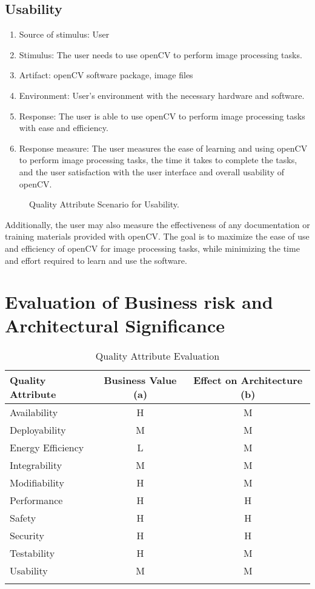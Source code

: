 \subsection{Usability\label{subSection::UsabilityQA}}
\begin{enumerate}
    \item Source of stimulus: User
    \item Stimulus: The user needs to use openCV to perform image processing tasks.
    \item Artifact: openCV software package, image files
    \item Environment: User's environment with the necessary hardware and software.
    \item Response: The user is able to use openCV to perform image processing tasks with ease and efficiency.
    \item Response measure: The user measures the ease of learning and using openCV to perform image processing tasks, the time it takes to complete the tasks, and the user satisfaction with the user interface and overall usability of openCV.
\end{enumerate}
\begin{figure}[H]
\caption{\label{Figure::Quality Attribute Scenario for Usability} Quality Attribute Scenario for Usability.}
\end{figure}
Additionally, the user may also measure the effectiveness of any documentation or training materials provided with openCV. The goal is to maximize the ease of use and efficiency of openCV for image processing tasks, while minimizing the time and effort required to learn and use the software.
\section{Evaluation of Business risk and Architectural Significance\label{Section::QAratings}}
\begin{longtable}{|l|c|c|}
\hline
\textbf{Quality Attribute} & \textbf{Business Value (a)} & \textbf{Effect on Architecture (b)} \\
\hline
Availability & H & M \\
Deployability & M & M \\
Energy Efficiency & L & M \\
Integrability & M & M \\
Modifiability & H & M \\
Performance & H & H \\
Safety & H & H \\
Security & H & H \\
Testability & H & M \\
Usability & M & M \\
\hline
\caption{Quality Attribute Evaluation \label{Table::Quality Attribute Evaluation}}
\end{longtable}
\newpage
